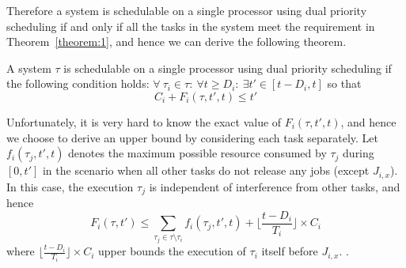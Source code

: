 Therefore a system  is schedulable on a single processor using dual priority scheduling  if and only if all the tasks in the system meet the requirement in Theorem~\ref{theorem:1}, and hence we can  derive the following theorem.
\begin{theorem}
A system $\tau$ is schedulable on a single processor using dual priority scheduling if the following condition holds: $\forall~\tau_i\in \tau:~\forall t\geq D_i:~\exists t'\in[t-D_i,t]$ so that 
\[
C_i+F_i(\tau,t',t)\leq t'
\]
\end{theorem}




Unfortunately, it is very hard to know the exact value of $F_i(\tau,t',t)$, and hence we choose to derive an upper bound by considering  each task separately. Let  $f_i(\tau_j,t',t)$ denotes the maximum possible resource consumed by $\tau_j$ during $[0,t']$ in the scenario when all  other tasks  do not release any jobs (except $J_{i,x}$). In this case, the execution $\tau_j$ is independent of interference from other tasks, and hence
\[
F_i(\tau,t')\leq 	 \sum_{\tau_j\in\tau\setminus \tau_i} f_i(\tau_j,t',t)+\lfloor \frac{t-D_i}{T_i} \rfloor \times C_i
\]
where $\lfloor \frac{t-D_i}{T_i} \rfloor \times C_i$ upper bounds the execution of $\tau_i$ itself before $J_{i,x}$.
.







